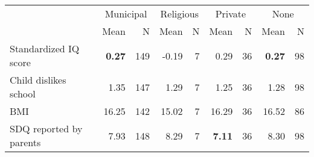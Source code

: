 \begin{tabular}{l r r r r r r r r}
\toprule
& \multicolumn{2}{c}{Municipal} & \multicolumn{2}{c}{Religious} & \multicolumn{2}{c}{Private} & \multicolumn{2}{c}{None} \\
& \scriptsize Mean & \scriptsize N & \scriptsize Mean & \scriptsize N & \scriptsize Mean & \scriptsize N & \scriptsize Mean & \scriptsize N \\
\midrule
Standardized IQ score & \textbf{     0.27} &       149 &     -0.19 &         7 &      0.29 &        36 & \textbf{     0.27} &        98 \\
Child dislikes school &      1.35 &       147 &      1.29 &         7 &      1.25 &        36 &      1.28 &        98 \\
BMI &     16.25 &       142 &     15.02 &         7 &     16.29 &        36 &     16.52 &        86 \\
SDQ reported by parents &      7.93 &       148 &      8.29 &         7 & \textbf{     7.11} &        36 &      8.30 &        98 \\
\bottomrule
\end{tabular}
